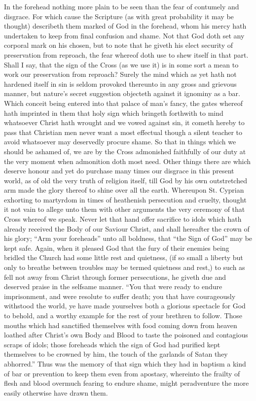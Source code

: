  In the forehead nothing more plain to be seen than the fear of contumely and disgrace. For which cause the Scripture (as with great probability it may be thought) describeth them marked of God in the forehead, whom his mercy hath undertaken to keep from final confusion and shame. Not that God doth set any corporal mark on his chosen, but to note that he giveth his elect security of preservation from reproach, the fear whereof doth use to shew itself in that part. Shall I say, that the sign of the Cross (as we use it) is in some sort a mean to work our preservation from reproach? Surely the mind which as yet hath not hardened itself in sin is seldom provoked thereunto in any gross and grievous manner, but nature’s secret suggestion objecteth against it ignominy as a bar. Which conceit being entered into that palace of man’s fancy, the gates whereof hath imprinted in them that holy sign which bringeth forthwith to mind whatsoever Christ hath wrought and we vowed against sin, it cometh hereby to pass that Christian men never want a most effectual though a silent teacher to avoid whatsoever may deservedly procure shame. So that in things which we should be ashamed of, we are by the Cross admonished faithfully of our duty at the very moment when admonition doth most need.
Other things there are which deserve honour and yet do purchase many times our disgrace in this present world, as of old the very truth of religion itself, till God by his own outstretched arm made the glory thereof to shine over all the earth. Whereupon St. Cyprian exhorting to martyrdom in times of heathenish persecution and cruelty, thought it not vain to allege unto them with other arguments the very ceremony of that Cross whereof we speak. Never let that  hand offer sacrifice to idols which hath already received the Body of our Saviour Christ, and shall hereafter the crown of his glory;
 “Arm your foreheads” unto all boldness, that “the Sign of God” may be kept safe.
Again, when it pleased God that the fury of their enemies being bridled the Church had some little rest and quietness, (if so small a liberty but only to breathe between troubles may be termed quietness and rest,) to such as fell not away from Christ through former persecutions, he giveth due and deserved praise in the selfsame manner. “You that were ready to endure imprisonment, and were resolute to suffer death; you that have courageously withstood the world, ye have made yourselves both a glorious spectacle for God to behold, and a worthy example for the rest of your brethren to follow. Those mouths which had sanctified themselves with food coming down from heaven loathed after Christ’s own Body and Blood to taste the poisoned and contagious scraps of idols; those foreheads which the sign of God had purified kept themselves to be crowned by him, the touch of the garlands of Satan they abhorred.” Thus was the memory of that sign which they had in baptism a kind of bar or prevention to keep them even from apostasy, whereinto the frailty of flesh and blood overmuch fearing to endure shame, might peradventure the more easily otherwise have drawn them.

